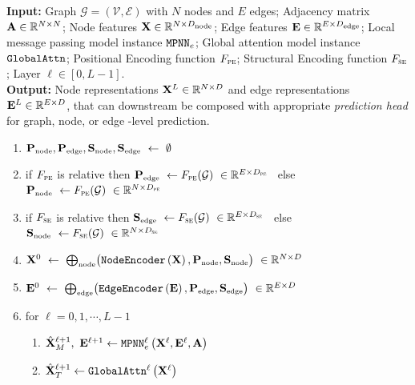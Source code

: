 \documentclass{article}
\begin{document}
\begin{algorithm}
\caption{Algorithm for an $L$ layer GPS network.}


\textbf{Input:} Graph $\mathcal{G} = (\mathcal{V}, \mathcal{E})$ with $N$ nodes and $E$ edges; 
Adjacency matrix $\mathbf{A} \in \mathbb{R}^{N \times N}$; 
Node features $\X \in \mathbb{R}^{N \times D_\textrm{\tiny  node} }$; 
Edge features $\E \in \mathbb{R}^{E \times D_\textrm{\tiny edge} }$;
Local message passing model instance $\texttt{MPNN}_e$;
Global attention model instance $\texttt{GlobalAttn}$; 
Positional Encoding function $F_\textsc{pe}$;
Structural Encoding function $F_\textsc{se}$;
Layer $\ell \in [0,L-1]$.\\ 
\textbf{Output:} Node representations $\mathbf{X}^L \in \mathbb{R}^{N \times D}$ and edge representations $\mathbf{E}^L \in \mathbb{R}^{E \times D}$, that can downstream be composed with appropriate \emph{prediction head} for graph, node, or edge -level prediction.
\begin{enumerate}
    \item $\mathbf{P}_\textrm{\tiny node}, \mathbf{P}_\textrm{\tiny edge}, \mathbf{S}_\textrm{\tiny node}, \mathbf{S}_\textrm{\tiny edge} \ \gets \ \emptyset$
    \item if $F_\textsc{pe}$ is relative then $\mathbf{P}_\textrm{\tiny edge} \ \gets F_\textsc{pe}(\mathcal{G}) \ \in \mathbb{R}^{E \times D_\textsc{pe}}$ \ else \ $\mathbf{P}_\textrm{\tiny node} \ \gets F_\textsc{pe}(\mathcal{G}) \ \in \mathbb{R}^{N \times D_\textsc{pe}} $
    \item if $F_\textsc{se}$ is relative then $\mathbf{S}_\textrm{\tiny edge} \ \gets F_\textsc{se}(\mathcal{G}) \ \in \mathbb{R}^{E \times D_\textsc{se}}$ \ else \ $\mathbf{S}_\textrm{\tiny node} \ \gets F_\textsc{se}(\mathcal{G}) \ \in \mathbb{R}^{N \times D_\textsc{se}} $
    \item $\X^{0} \ \gets \ \bigoplus_\textrm{\tiny node} \bigl( \nodeenc \left(\X\right), \mathbf{P}_\textrm{\tiny node}, \mathbf{S}_\textrm{\tiny node} \bigr) \ \in \mathbb{R}^{N \times D}$ 
    \item $\E^{0} \ \gets \ \bigoplus_\textrm{\tiny edge} \bigl( \edgeenc \left(\E\right), \mathbf{P}_\textrm{\tiny edge}, \mathbf{S}_\textrm{\tiny edge} \bigr) \ \in \mathbb{R}^{E \times D}$ 
    \item for $\ell = 0, 1, \cdots , L-1 $
    \begin{enumerate}
        \item $\hat{\mathbf{X}}^{\ell+1}_M, \ \mathbf{E}^{\ell+1} \gets \texttt{MPNN}_e^{\ell} \left(\mathbf{X}^{\ell}, \mathbf{E}^{\ell}, \mathbf{A} \right)$
        \item $\hat{\mathbf{X}}^{\ell+1}_T \gets  \texttt{GlobalAttn}^{\ell} \left(\mathbf{X}^{\ell}  \right)$

\end{enumerate}
\end{enumerate}
\end{algorithm}
\end{document}
